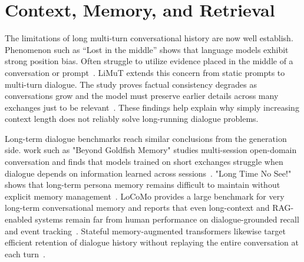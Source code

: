 \section{Context, Memory, and Retrieval}\label{subsec:memory_related}

The limitations of long multi-turn conversational history are now well establish. Phenomenon such as ``Lost in the middle'' shows that language models exhibit strong position bias. Often struggle to utilize evidence placed in the middle of a conversation or prompt~\cite{liu2023lostinthemiddle}. LiMuT extends this concern from static prompts to multi-turn dialogue. The study proves factual consistency degrades as conversations grow and the model must preserve earlier details across many exchanges just to be relevant~\cite{laban2024limt}. These findings help explain why simply increasing context length does not reliably solve long-running dialogue problems.










Long-term dialogue benchmarks reach similar conclusions from the generation side. work such as "Beyond Goldfish Memory" studies multi-session open-domain conversation and finds that models trained on short exchanges struggle when dialogue depends on information learned across sessions~\cite{xu2022goldfish}. "Long Time No See!" shows that long-term persona memory remains difficult to maintain without explicit memory management~\cite{xu2022longpersona}. LoCoMo provides a large benchmark for very long-term conversational memory and reports that even long-context and RAG-enabled systems remain far from human performance on dialogue-grounded recall and event tracking~\cite{maharana2024locomo}. Stateful memory-augmented transformers likewise target efficient retention of dialogue history without replaying the entire conversation at each turn~\cite{wu2024stateful}.














